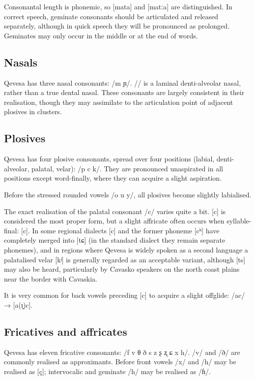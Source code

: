 \documentclass[grammar]{subfiles}
\begin{document}
Consonantal length is phonemic, so [mata] and [matːa] are distinguished.  In
correct speech, geminate consonants should be articulated and released
separately, although in quick speech they will be pronounced as prolonged.
Geminates may only occur in the middle or at the end of words.


\subsection{Nasals}
\label{ssec:nasals}

Qevesa has three nasal consonants: /m  ɲ/.  // is a laminal
denti-alveolar nasal, rather than a true dental nasal.  These consonants are
largely consistent in their realisation, though they may assimilate to the
articulation point of adjacent plosives in clusters. 


\subsection{Plosives}
\label{ssec:plosives}

Qevesa has four plosive consonants, spread over four positions (labial,
denti-alveolar, palatal, velar): /p  c k/.  They are pronounced
unaspirated in all positions except word-finally, where they can acquire
a slight aspiration.

Before the stressed rounded vowels /o u y/, all plosives become slightly
labialised.

The exact realisation of the palatal consonant /c/ varies quite a bit.  [c] is
considered the most proper form, but a slight affricate often occurs when
syllable-final: [c].  In some regional dialects [c] and the former
phoneme [cʰ] have completely merged into [tɕ] (in the standard dialect they
remain separate phonemes), and in regions where Qevesa is widely spoken as a
second language a palatalised velar [kʲ] is generally regarded as an acceptable
variant, although [ts] may also be heard, particularly by Cavasko speakers
on the north coast plains near the border with Cavaskia.

It is very common for back vowels preceding [c] to acquire a slight offglide:
/ac/ → [a(ɪ̯)c].


\subsection{Fricatives and affricates}
\label{ssec:fricatives}

Qevesa has eleven fricative consonants: /f v θ ð s z ʂ ʐ ɕ x h/.  /v/ and /ð/ are
commonly realised as approximants.  Before front vowels /x/ and /h/ may be realised
as [ç]; intervocalic and geminate /h/ may be realised as /ɦ/. 
\end{document}
